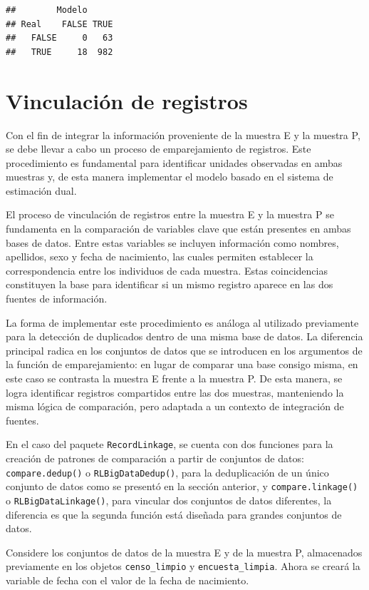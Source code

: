 \documentclass[
  12pt,
]{book}
\begin{document}
\begin{verbatim}
##        Modelo
## Real    FALSE TRUE
##   FALSE     0   63
##   TRUE     18  982
\end{verbatim}

\section{Vinculación de registros}\label{vinculaciuxf3n-de-registros}

Con el fin de integrar la información proveniente de la muestra E y la muestra P, se debe llevar a cabo un proceso de emparejamiento de registros. Este procedimiento es fundamental para identificar unidades observadas en ambas muestras y, de esta manera implementar el modelo basado en el sistema de estimación dual.

El proceso de vinculación de registros entre la muestra E y la muestra P se fundamenta en la comparación de variables clave que están presentes en ambas bases de datos. Entre estas variables se incluyen información como nombres, apellidos, sexo y fecha de nacimiento, las cuales permiten establecer la correspondencia entre los individuos de cada muestra. Estas coincidencias constituyen la base para identificar si un mismo registro aparece en las dos fuentes de información.

La forma de implementar este procedimiento es análoga al utilizado previamente para la detección de duplicados dentro de una misma base de datos. La diferencia principal radica en los conjuntos de datos que se introducen en los argumentos de la función de emparejamiento: en lugar de comparar una base consigo misma, en este caso se contrasta la muestra E frente a la muestra P. De esta manera, se logra identificar registros compartidos entre las dos muestras, manteniendo la misma lógica de comparación, pero adaptada a un contexto de integración de fuentes.

En el caso del paquete \texttt{RecordLinkage}, se cuenta con dos funciones para la creación de patrones de comparación a partir de conjuntos de datos: \texttt{compare.dedup()} o \texttt{RLBigDataDedup()}, para la deduplicación de un único conjunto de datos como se presentó en la sección anterior, y \texttt{compare.linkage()} o \texttt{RLBigDataLinkage()}, para vincular dos conjuntos de datos diferentes, la diferencia es que la segunda función está diseñada para grandes conjuntos de datos.

Considere los conjuntos de datos de la muestra E y de la muestra P, almacenados previamente en los objetos \texttt{censo\_limpio} y \texttt{encuesta\_limpia}. Ahora se creará la variable de fecha con el valor de la fecha de nacimiento.
\end{document}
